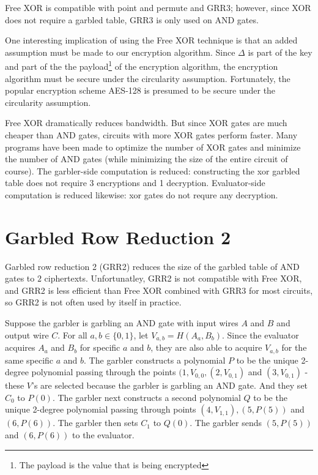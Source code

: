 Free XOR is compatible with point and permute and GRR3; however, since XOR does not require a garbled table, GRR3 is only used on AND gates.

One interesting implication of using the Free XOR technique is that an added assumption must be made to our encryption algorithm.
Since $\Delta$ is part of the key and part of the the payload\footnote{The payload is the value that is being encrypted} of the encryption algorithm, the encryption algorithm must be secure under the circularity assumption.
Fortunately, the popular encryption scheme AES-128 is presumed to be secure under the circularity assumption.

Free XOR dramatically reduces bandwidth.
But since XOR gates are much cheaper than AND gates, circuits with more XOR gates perform faster.
Many programs have been made to optimize the number of XOR gates and minimize the number of AND gates (while minimizing the size of the entire circuit of course).
The garbler-side computation is reduced: constructing the xor garbled table does not require 3 encryptions and 1 decryption.
Evaluator-side computation is reduced likewise: xor gates do not requre any decryption.

\section{Garbled Row Reduction 2}
Garbled row reduction 2 (GRR2) reduces the size of the garbled table of AND gates to $2$ ciphertexts.
Unfortunatley, GRR2 is not compatible with Free XOR, and GRR2 is less efficient than Free XOR combined with GRR3 for most circuits, so GRR2 is not often used by itself in practice.

Suppose the garbler is garbling an AND gate with input wires $A$ and $B$ and output wire $C$.
For all $a,b \in \{0,1\}$, let $V_{a,b} = H(A_a, B_b)$.
Since the evaluator acquires $A_a$ and $B_b$ for specific $a$ and $b$, they are also able to acquire $V_{a,b}$ for the same specific $a$ and $b$.
The garbler constructs a polynomial $P$ to be the unique 2-degree polynomial passing through the points $(1, V_{0,0}, (2, V_{0,1})$ and $(3, V_{0,1})$ - these $V$'s are selected because the garbler is garbling an AND gate.
And they set $C_0$ to $P(0)$.
The garbler next constructs a second polynomial $Q$ to be the unique 2-degree polynomial passing through points $(4, V_{1,1}), (5, P(5))$ and  $(6, P(6))$.
The garbler then sets $C_1$ to $Q(0)$.
The garbler sends $(5, P(5))$ and $(6, P(6))$ to the evaluator.

